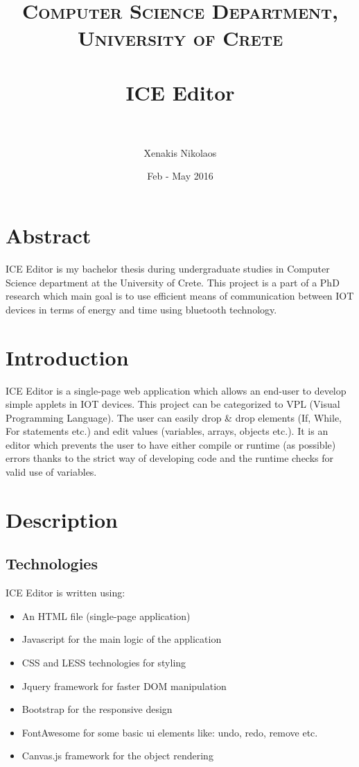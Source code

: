 \documentclass[paper=a4, fontsize=11pt]{scrartcl}
\title{
		\usefont{OT1}{bch}{b}{n}
		\normalfont \normalsize \textsc{Computer Science Department, University of Crete} \\ [25pt]
		\horrule{0.5pt} \\[0.4cm]
		\huge ICE Editor \\
		\horrule{2pt} \\[0.5cm]
}
\author{\normalfont \normalsize Xenakis Nikolaos\\[-3pt]}
\date{\normalsize Feb - May 2016}
\begin{document}
\maketitle

\section{Abstract}        
	ICE Editor is my bachelor thesis during undergraduate studies in Computer Science department at the University of Crete. This project is a part of a PhD research which main goal is to use efficient means of communication between IOT devices in terms of energy and time using bluetooth technology.

\section{Introduction}
	ICE Editor is a single-page web application which allows an end-user to develop simple applets in IOT devices. This project can be categorized to VPL (Visual Programming Language). The user can easily drop \& drop elements (If, While, For statements etc.) and edit values (variables, arrays, objects etc.). It is an editor which prevents the user to have either compile or runtime (as possible) errors thanks to the strict way of developing code and the runtime checks for valid use of variables.

\section{Description}

	\subsection{Technologies}
		ICE Editor is written using:
		\begin{itemize}
		  \item An HTML file (single-page application)
		  \item Javascript for the main logic of the application
		  \item CSS and LESS technologies for styling
		  \item Jquery framework for faster DOM manipulation
		  \item Bootstrap for the responsive design
		  \item FontAwesome for some basic ui elements like: undo, redo, remove etc.
		  \item  Canvas.js framework for the object rendering
		\end{itemize}
\end{document}
